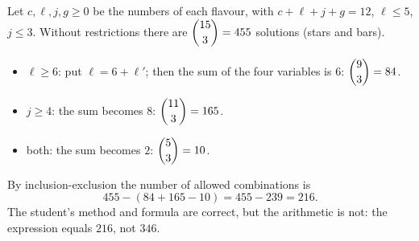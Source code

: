 Let $c,\ell,j,g\ge0$ be the numbers of each flavour, with $c+\ell+j+g=12$, $\ell\le5$, $j\le3$. Without restrictions there are $\dbinom{15}{3}=455$ solutions (stars and bars).
\begin{itemize}
\item $\ell\ge6$: put $\ell=6+\ell'$; then the sum of the four variables is $6$: $\dbinom93=84$.
\item $j\ge4$: the sum becomes $8$: $\dbinom{11}{3}=165$.
\item both: the sum becomes $2$: $\dbinom53=10$.
\end{itemize}
By inclusion-exclusion the number of allowed combinations is
\[
455-(84+165-10)=455-239=\boxed{216}.
\]
The student's method and formula are correct, but the arithmetic is not: the expression equals $216$, not $346$.

